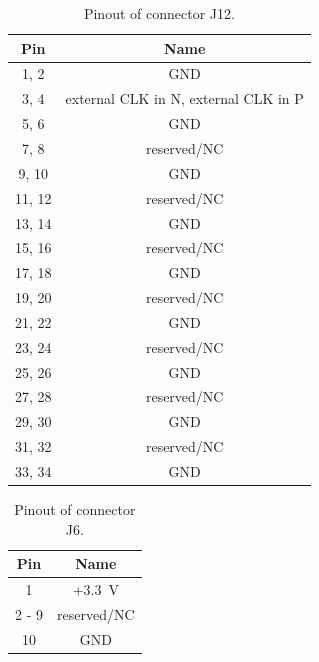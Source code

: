 	\begin{table}
	\begin{small}
		\begin{center}
			\begin{tabular}{|c|c|}
				\hline
				Pin & Name\\
				\hline\hline
				1, 2 & GND\\
				\hline
				3, 4 & external CLK in N, external CLK in P\\
				\hline
				5, 6 & GND\\
				\hline
				7, 8 & reserved/NC\\
				\hline
				9, 10 & GND\\
				\hline
				11, 12 & reserved/NC\\
				\hline
				13, 14 & GND\\
				\hline
				15, 16 & reserved/NC\\
				\hline
				17, 18 & GND\\
				\hline
				19, 20 & reserved/NC\\
				\hline
				21, 22 & GND\\
				\hline
				23, 24 & reserved/NC\\
				\hline
				25, 26 & GND\\
				\hline
				27, 28 & reserved/NC\\
				\hline
				29, 30 & GND\\
				\hline
				31, 32 & reserved/NC\\
				\hline
				33, 34 & GND\\
				\hline
			\end{tabular}
			\caption{Pinout of connector J12.}
			\label{J12}
		\end{center}
	\end{small}
	\end{table}

	\begin{table}
	\begin{small}
		\begin{center}
			\begin{tabular}{|c|c|}
				\hline
				Pin & Name\\
				\hline\hline
				1 & +\SI{3.3}{\volt}\\
				\hline
				2 - 9 & reserved/NC\\
				\hline
				10 & GND\\
				\hline
			\end{tabular}
			\caption{Pinout of connector J6.}
			\label{J6}
		\end{center}
	\end{small}
	\end{table}

